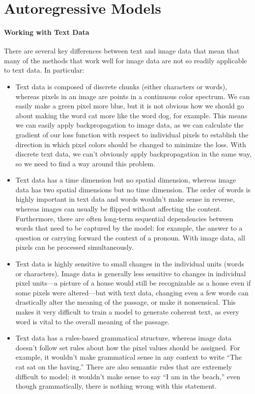 \section{Autoregressive Models}

\paragraph{Working with Text Data}

There are several key differences between text and image data that mean that many of the methods that work well for image data are not so readily applicable to text data.
In particular:

\begin{itemize}
	\item Text data is composed of discrete chunks (either characters or words), whereas pixels in an image are points in a continuous color spectrum.
	      We can easily make a green pixel more blue, but it is not obvious how we should go about making the word cat more like the word dog, for example.
	      This means we can easily apply backpropagation to image data, as we can calculate the gradient of our loss function with respect to individual pixels to establish the direction in which pixel colors should be changed to minimize the loss.
	      With discrete text data, we can’t obviously apply backpropagation in the same way, so we need to find a way around this problem.

	\item Text data has a time dimension but no spatial dimension, whereas image data has two spatial dimensions but no time dimension.
	      The order of words is highly important in text data and words wouldn’t make sense in reverse, whereas images can usually be flipped without affecting the content.
	      Furthermore, there are often long-term sequential dependencies between words that need to be captured by the model: for example, the answer to a question or carrying forward the context of a pronoun.
	      With image data, all pixels can be processed simultaneously.

	\item Text data is highly sensitive to small changes in the individual units (words or characters).
	      Image data is generally less sensitive to changes in individual pixel units—a picture of a house would still be recognizable as a house even if some pixels were altered—but with text data, changing even a few words can drastically alter the meaning of the passage, or make it nonsensical.
	      This makes it very difficult to train a model to generate coherent text, as every word is vital to the overall meaning of the passage.

	\item Text data has a rules-based grammatical structure, whereas image data doesn’t follow set rules about how the pixel values should be assigned.
	      For example, it wouldn’t make grammatical sense in any context to write ``The cat sat on the having.''
	      There are also semantic rules that are extremely difficult to model; it wouldn’t make sense to say ``I am in the beach,'' even though grammatically, there is nothing wrong with this statement.
\end{itemize}

